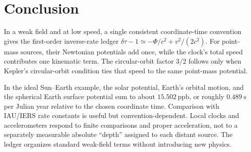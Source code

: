 \documentclass[12pt]{article}
\begin{document}
\section{Conclusion}

In a weak field and at low speed, a single consistent coordinate-time convention gives the first-order inverse-rate ledger $\delta\tau-1\simeq-\Phi/c^2+v^2/(2c^2)$. For point-mass sources, their Newtonian potentials add once, while the clock's total speed contributes one kinematic term. The circular-orbit factor $3/2$ follows only when Kepler's circular-orbit condition ties that speed to the same point-mass potential.

In the ideal Sun--Earth example, the solar potential, Earth's orbital motion, and the spherical Earth surface potential sum to about $15.502\ \mathrm{ppb}$, or roughly $0.489\ \mathrm{s}$ per Julian year relative to the chosen coordinate time. Comparison with IAU/IERS rate constants is useful but convention-dependent. Local clocks and accelerometers respond to finite comparisons and proper acceleration, not to a separately measurable absolute ``depth'' assigned to each distant source. The ledger organizes standard weak-field terms without introducing new physics.
\end{document}
